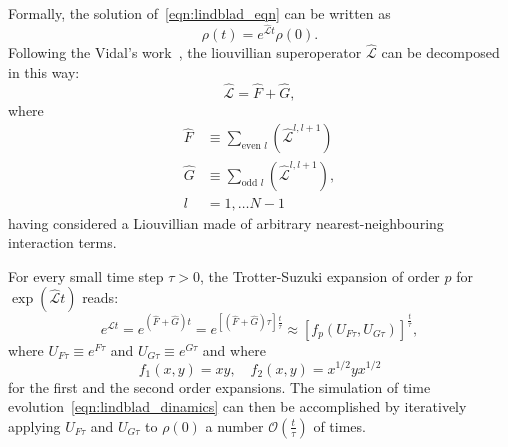 Formally, the solution of~\ref{eqn:lindblad_eqn} can be written as
\begin{equation}
\label{eqn:lindblad_dinamics}
    \rho(t) = e^{\hat{\mathcal{L}}t}\rho(0).
\end{equation}
Following the Vidal's work~\cite{PhysRevLett.93.040502}, the liouvillian superoperator $\hat{\mathcal{L}}$ can be decomposed in this way:
\begin{equation}
    \hat{\mathcal{L}} = \hat{F} + \hat{G},
\end{equation}
where
\begin{equation}
    \begin{split}
        \hat{F} &\equiv \sum_{\text{even } l} (\hat{\mathcal{L}}^{l, l+1}) \\
        \hat{G} &\equiv \sum_{\text{odd } l} (\hat{\mathcal{L}}^{l, l+1}), \\
        l  &= 1, \dots N-1
    \end{split}
\end{equation}
having considered a Liouvillian made of arbitrary nearest-neighbouring interaction terms.

For every small time step $\tau > 0$, the Trotter-Suzuki expansion of order $p$ for $\exp{(\hat{\mathcal{L}} t)}$ reads:
\begin{equation*}
    e^{\hat{\mathcal{L}}t} = e^{(\hat{F}+ \hat{G})t} = e^{[(\hat{F}+ \hat{G})\tau]\frac{t}{\tau}} \approx [f_p(U_{F\tau}, U_{G\tau})]^{\frac{t}{\tau}},
\end{equation*}
where $U_{F\tau} \equiv e^{F\tau}$ and $U_{G\tau} \equiv e^{G\tau}$ and where
\begin{equation*}
    f_1(x,y) = xy, \quad f_2(x, y) = x^{1/2}yx^{1/2}
\end{equation*}
for the first and the second order expansions.
The simulation of time evolution~\ref{eqn:lindblad_dinamics} can then be accomplished by iteratively applying $U_{F\tau}$ and $U_{G\tau}$ to $\rho(0)$ a number $\mathcal{O}(\frac{t}{\tau})$ of times.


